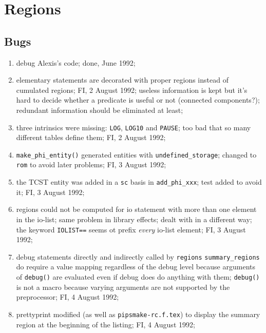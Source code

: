 \newpage

\section{Regions}

\subsection{Bugs}

\begin{enumerate}

  \item debug Alexis's code; done, June 1992;

  \item elementary statements are decorated with proper regions
	instead of cumulated regions; FI, 2 August 1992;
	useless information is kept but it's hard to decide whether
	a predicate is useful or not (connected components?);
	redundant information should be eliminated at least;

  \item three intrinsics were missing: \verb+LOG+, \verb+LOG10+ and
	\verb+PAUSE+; too bad that so many different tables define
	them; FI, 2 August 1992;

  \item \verb+make_phi_entity()+ generated entities with 
	\verb+undefined_storage+; changed to \verb+rom+ to avoid
	later problems; FI, 3 August 1992;

  \item the TCST entity was added in a \verb+sc+ basis in \verb+add_phi_xxx+;
	test added to avoid it; FI, 3 August 1992;

  \item regions could not be computed for io statement with more than
	one element in the io-list; same problem in library effects;
	dealt with in a different way; the keyword \verb+IOLIST==+
	seems ot prefix {\em every} io-list element; FI, 3 August 1992;

  \item debug statements directly and indirectly called by \verb+regions+
	\verb+summary_regions+ do require a value mapping regardless of
	the debug level because arguments of \verb+debug()+ are evaluated
	even if debug does do anything with them; \verb+debug()+ is not
	a macro because varying arguments are not supported by the
	preprocessor; FI, 4 August 1992;

  \item prettyprint modified (as well as \verb+pipsmake-rc.f.tex+) 
	to display the summary region at the beginning of the listing;
	FI, 4 August 1992;


\end{enumerate}
